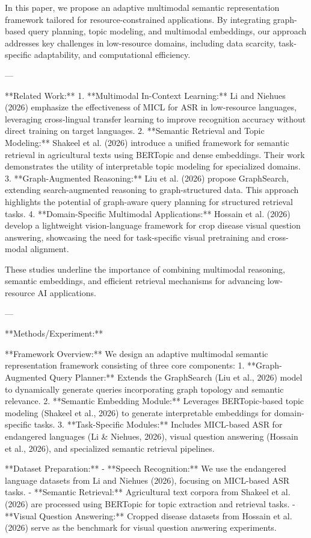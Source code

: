 In this paper, we propose an adaptive multimodal semantic representation framework tailored for resource-constrained applications. By integrating graph-based query planning, topic modeling, and multimodal embeddings, our approach addresses key challenges in low-resource domains, including data scarcity, task-specific adaptability, and computational efficiency.  

---

**Related Work:**  
1. **Multimodal In-Context Learning:** Li and Niehues (2026) emphasize the effectiveness of MICL for ASR in low-resource languages, leveraging cross-lingual transfer learning to improve recognition accuracy without direct training on target languages.  
2. **Semantic Retrieval and Topic Modeling:** Shakeel et al. (2026) introduce a unified framework for semantic retrieval in agricultural texts using BERTopic and dense embeddings. Their work demonstrates the utility of interpretable topic modeling for specialized domains.  
3. **Graph-Augmented Reasoning:** Liu et al. (2026) propose GraphSearch, extending search-augmented reasoning to graph-structured data. This approach highlights the potential of graph-aware query planning for structured retrieval tasks.  
4. **Domain-Specific Multimodal Applications:** Hossain et al. (2026) develop a lightweight vision-language framework for crop disease visual question answering, showcasing the need for task-specific visual pretraining and cross-modal alignment.  

These studies underline the importance of combining multimodal reasoning, semantic embeddings, and efficient retrieval mechanisms for advancing low-resource AI applications.  

---

**Methods/Experiment:**  

**Framework Overview:**  
We design an adaptive multimodal semantic representation framework consisting of three core components:  
1. **Graph-Augmented Query Planner:** Extends the GraphSearch (Liu et al., 2026) model to dynamically generate queries incorporating graph topology and semantic relevance.  
2. **Semantic Embedding Module:** Leverages BERTopic-based topic modeling (Shakeel et al., 2026) to generate interpretable embeddings for domain-specific tasks.  
3. **Task-Specific Modules:** Includes MICL-based ASR for endangered languages (Li & Niehues, 2026), visual question answering (Hossain et al., 2026), and specialized semantic retrieval pipelines.  

**Dataset Preparation:**  
- **Speech Recognition:** We use the endangered language datasets from Li and Niehues (2026), focusing on MICL-based ASR tasks.  
- **Semantic Retrieval:** Agricultural text corpora from Shakeel et al. (2026) are processed using BERTopic for topic extraction and retrieval tasks.  
- **Visual Question Answering:** Cropped disease datasets from Hossain et al. (2026) serve as the benchmark for visual question answering experiments.  

